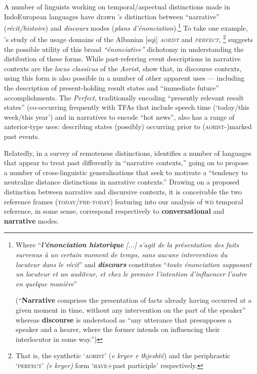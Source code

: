 A number of linguists working on temporal/aspectual distinctions made in Indo\-European languages have drawn \citeauthor{Benveniste1966}'s distinction between ``narrative'' (\textit{récit\slash{}histoire}) and \textit{discours} modes (\textit{plans d'énonciation}).\footnote{Where ``\textit{\textbf{l'énonciation historique} [...] s'agit de la présentation des faits survenus à un certain moment de temps, sans aucune intervention du locuteur dans le récit}'' and \textit{\textbf{discours}} constitutes ``\textit{toute énonciation supposant un locuteur et un auditeur, et chez le premier l'intention d'influencer l'autre en quelque manière}''
	
	(``\textbf{Narrative} comprises the presentation of facts already having occurred at a given moment in time, without any intervention on the part of the speaker'' whereas \textbf{discourse} is understood as ``any utterance that presupposes a speaker and a hearer, where the former intends on influencing their interlocutor in some way.'')} To take one example, \citeauthor{Duchet2016}'s \citeyearpar{Duchet2016} study of the usage domains of the Albanian [\gls{sqi}] \textit{\textsc{aorist}} and \textit{\textsc{perfect}},
 \footnote{That is, the synthetic `\textsc{aorist}' (\textit{e kryer e thjeshtë}) and the periphrastic `\textsc{perfect}' \textit{(e kryer)} form `\textsc{have}+past participle' respectively.} suggests the possible utility of this broad \textit{``énonciative''} dichotomy in understanding the distibution of these forms. While past-referring event descriptions in narrative contexts are the \textit{locus classicus} of the \textit{Aorist}, \citeauthor{Duchet2016} show that, in discourse contexts, using this form is also possible in a number of other apparent uses --- including the description of present-holding result states and ``immediate future'' accomplishments. The  \textit{Perfect}, traditionally encoding ``presently relevant result states'' (co-occurring frequently with TFAs that include speech time (`today/this week/this year') and in narratives to encode ``hot news'', also has a range of anterior-type uses: describing states (possibly) occurring prior to (\textsc{aorist-})marked past events.
 
Relatedly, in a survey of remoteness distinctions, \citet[116\textit{ff}]{Dahl1983} identifies a number of languages that appear to treat past differently in ``narrative contexts,'' going on to propose a number of cross-linguistic generalisations that seek to motivate a ``tendency to neutralize distance distinctions in narrative contexts.'' Drawing on a proposed distinction between narrative and discursive contexts, it is conceivable the two reference frames (\textsc{today\slash{}pre-today}) featuring into our analysis of \textsc{wd} temporal reference, in some sense, correspond respectively to \textbf{conversational} and \textbf{narrative} modes. 
 
